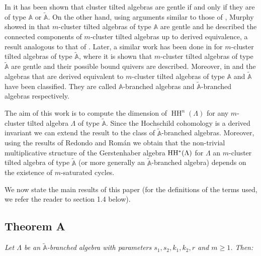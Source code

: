 \documentclass{amsart}
\theoremstyle{plain}
\theoremstyle{definition}
\begin{document}
In \cite{ABCP09} it has been shown that cluster tilted algebras are gentle if and only if they are of type  $\mathbb{A}$ or $\tilde{\mathbb{A}}$. On the other hand, using arguments similar to those of \cite{ABCP09}, Murphy showed in \cite{Murphy2010} that $m$-cluster tilted algebras of type $\mathbb{A}$ are gentle and he described the connected components of $m$-cluster tilted algebras up to derived equivalence, a result analogous to that of \cite{Buan2008}. Later, a similar work has been done in \cite{Gubitosi} for  $m$-cluster tilted algebras of type $\mathbb{\widetilde{A}}$, where it is shown that $m$-cluster tilted algebras of type $\mathbb{\widetilde{A}}$ are gentle and their possible bound quivers are described. Moreover, in \cite{BG14} and \cite{Gub1} the algebras that are derived equivalent to $m$-cluster tilted algebras of type  $\mathbb{A}$ and $\mathbb{\widetilde{A}}$ have been classified. They are called $\mathbb{A}$-branched algebras   \cite[Definition 4.3]{BG14} and  $\mathbb{\widetilde{A}}$-branched algebras \cite[Definition 3.2 ]{Gub1} respectively.

The aim of this work is to compute the dimension of $\operatorname{HH}^{n}(\Lambda)$ for any $m$-cluster tilted algebra $\Lambda$ of type $\tilde{\mathbb{A}}$. Since the  Hochschild cohomology is a derived invariant \cite{Ric91} we can extend the result to  the class  of $\tilde{\mathbb{A}}$-branched algebras.  Moreover, using the results of Redondo and Rom\'an we obtain that the non-trivial multiplicative structure of the Gerstenhaber algebra $\rm HH^*(\Lambda)$ for  $\Lambda$  an $m$-cluster tilted algebra  of type $\tilde{\mathbb{A}}$ (or more generally  an  $\tilde{\mathbb{A}}$-branched algebra) depends on the existence of  $m$-saturated cycles.

We now state the main results of this paper (for the definitions of the terms used, we refer the reader to section 1.4  below).

\subsection*{Theorem A}\textit{ Let $\Lambda$ be an   $\tilde{\mathbb{A}}$-branched algebra with parameters $s_1,s_2,k_1,k_2,r$ and  $m\geq 1$.   Then:}
\end{document}

